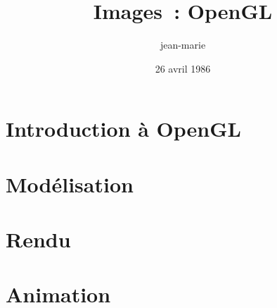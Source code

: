\documentclass[a4paper, 10pt]{article}
\title{Images~: OpenGL}
\date{26 avril 1986}
\author{jean-marie}
\begin{document}
\maketitle

\tableofcontents

\section{Introduction à OpenGL}

\section{Modélisation}

\section{Rendu}

\section{Animation}
\end{document}
